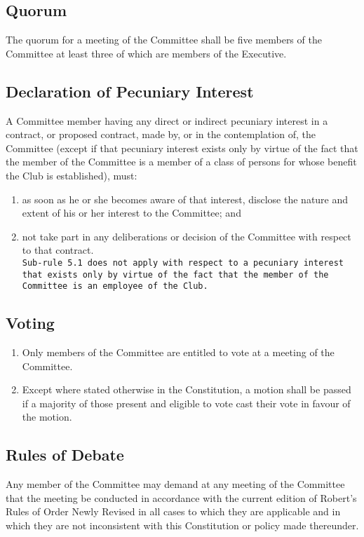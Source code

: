 \documentclass[11pt]{article} %
\begin{document}
\subsection{Quorum}
The quorum for a meeting of the Committee shall be five members of the Committee at least three of which are members of the Executive.\\

\subsection{Declaration of Pecuniary Interest}
A Committee member having any direct or indirect pecuniary interest in a contract, or proposed contract, made by, or in the contemplation of, the Committee (except if that pecuniary interest exists only by virtue of the fact that the member of the Committee is a member of a class of persons for whose benefit the Club is established), must:
\begin{enumerate}
	\item as soon as he or she becomes aware of that interest, disclose the nature and extent of his or her interest to the Committee; and
	\item not take part in any deliberations or decision of the Committee with respect to that contract.\\
\texttt{Sub-rule 5.1 does not apply with respect to a pecuniary interest that exists only by virtue of the fact that the member of the Committee is an employee of the Club.}
\end{enumerate}

\subsection{Voting}
\begin{enumerate}
	\item Only members of the Committee are entitled to vote at a meeting of the Committee.
	\item Except where stated otherwise in the Constitution, a motion shall be passed if a majority of those present and eligible to vote cast their vote in favour of the motion.
\end{enumerate}

\subsection{Rules of Debate}
Any member of the Committee may demand at any meeting of the Committee that the meeting be conducted in accordance with the current edition of Robert’s Rules of Order Newly Revised in all cases to which they are applicable and in which they are not inconsistent with this Constitution or policy made thereunder.
\end{document}
